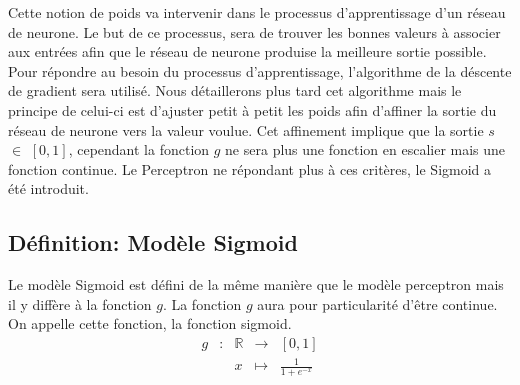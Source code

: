 \documentclass{article}
\newcommand{\fonction}[5]{
	\begin{array}{ccccc}
#1 & : & #2 & \to & #3\\
	& & #4 & \mapsto & #5\\ 
	\end{array}
}
\begin{document}
Cette notion de poids va intervenir dans le processus d'apprentissage d'un réseau de neurone. Le but de ce processus, sera de trouver les bonnes valeurs à associer aux entrées afin que le réseau de neurone produise la meilleure sortie possible. Pour répondre au besoin du processus d'apprentissage, l'algorithme de la déscente de gradient sera utilisé. Nous détaillerons plus tard cet algorithme mais le principe de celui-ci est d'ajuster petit à petit les poids afin d'affiner la sortie du réseau de neurone vers la valeur voulue. Cet affinement implique que la sortie $s$ $\in$ $\left[0,1\right]$, cependant la fonction $g$ ne sera  plus une fonction en escalier mais une fonction continue. Le Perceptron ne répondant plus à ces critères, le Sigmoid a été introduit. \\
	\subsection{Définition: Modèle Sigmoid}
	 Le modèle Sigmoid est défini de la même manière que le modèle perceptron mais il y diffère à la fonction $g$. La fonction $g$ aura pour particularité d'être continue. On appelle cette fonction, la fonction sigmoid.  
		  \[ \fonction{g}{\mathbb{R}}{\left[0,1\right]}{x}{ \frac{1}{1+ e^{-x}}} \]


\vfill
\begin{center}
\end{center}
\vfill
		
\end{document}
